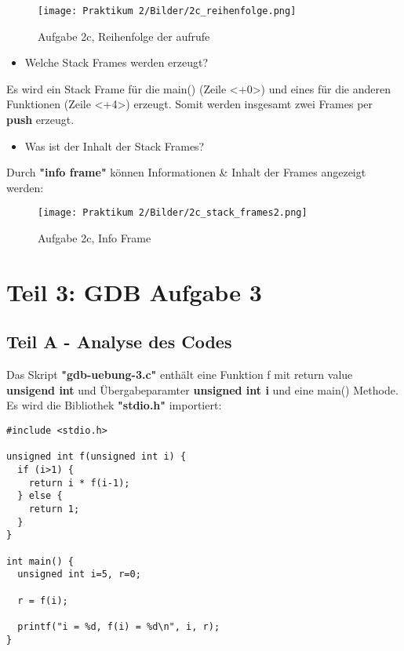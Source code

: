 \documentclass[12pt]{article}
\begin{document}
\begin{figure}[htbp]
    \centering
    \texttt{[image: Praktikum 2/Bilder/2c\_reihenfolge.png]}
    \caption{Aufgabe 2c, Reihenfolge der aufrufe}
\end{figure}
  
\begin{itemize}
  \item Welche Stack Frames werden erzeugt?
\end{itemize}
Es wird ein Stack Frame für die main() (Zeile <+0>) und eines für die anderen Funktionen (Zeile <+4>) erzeugt. Somit werden insgesamt zwei Frames per \textbf{push} erzeugt.
\newpage

\begin{itemize}
  \item Was ist der Inhalt der Stack Frames?
\end{itemize}
Durch \textbf{"info frame"} können Informationen \& Inhalt der Frames angezeigt werden:
\begin{figure}[htbp]
    \centering
    \texttt{[image: Praktikum 2/Bilder/2c\_stack\_frames2.png]}
    \caption{Aufgabe 2c, Info Frame}
\end{figure}
\newpage

\section{Teil 3: GDB Aufgabe 3}
\subsection{Teil A - Analyse des Codes}

Das Skript \textbf{"gdb-uebung-3.c"} enthält eine Funktion f mit return value \textbf{unsigend int} und Übergabeparamter \textbf{unsigned int i} und eine main() Methode. Es wird die Bibliothek \textbf{"stdio.h"} importiert:

\begin{lstlisting}
#include <stdio.h>

unsigned int f(unsigned int i) {
  if (i>1) {
    return i * f(i-1);
  } else {
    return 1;
  }
}

int main() {
  unsigned int i=5, r=0;

  r = f(i);

  printf("i = %d, f(i) = %d\n", i, r);
}
\end{lstlisting}
\end{document}
